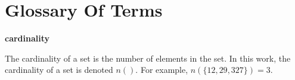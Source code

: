 \chapter*{Glossary Of Terms}

\label{cglo2}

\begin{vworktermglossaryenum}

\item \textbf{cardinality}

      The cardinality of a set is the
      number of elements in the set.  In this work, the cardinality
      of a set is denoted $n()$.  For example, 
      $n(\{12,29,327\}) = 3$.

\end{vworktermglossaryenum}

